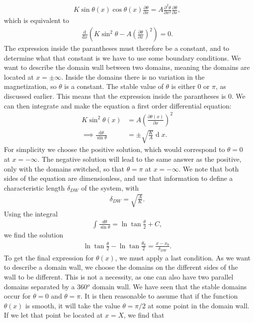 \documentclass[12pt, a4paper, twoside, openright]{article}		%
\renewcommand{\d}[1]{\ensuremath{\operatorname{d}\!{#1}}}
\numberwithin{equation}{section}
\begin{document}
\begin{align}
\label{eq:theta_doublediff}
K\sin \theta (x) \cos \theta (x) \frac{\partial \theta}{\partial x} = A \frac{\partial^2 \theta}{\partial x^2}\frac{\partial \theta}{\partial x},
\end{align}
which is equivalent to
\begin{align}
\frac{\textrm{d}}{\textrm{d} x} \left(K \sin ^2 \theta - A (\frac{\partial \theta}{\partial x})^2\right) = 0.
\end{align}
The expression inside the parantheses must therefore be a constant, and to determine what that constant is we have to use some boundary conditions. We want to describe the domain wall between two domains, meaning the domains are located at $x = \pm \infty$. Inside the domains there is no variation in the magnetization, so $\theta$ is a constant. The stable value of $\theta$ is either 0 or $\pi$, as discussed earlier. This means that the expression inside the parantheses is 0. We can then integrate and make the equation a first order differential equation:
\begin{align*}
K \sin ^2 \theta(x) &= A \left(\frac{\partial \theta(x)}{\partial x}\right)^2 \\
\implies \frac{\textrm{d} \theta}{\sin \theta} &= \pm \sqrt{\frac{K}{A}} \d x.
\end{align*}
For simplicity we choose the positive solution, which would correspond to $\theta = 0$ at $x = -\infty$. The negative solution will lead to the same answer as the positive, only with the domains switched, so that $\theta = \pi$ at $x = -\infty$. We note that both sides of the equation are dimensionless, and use that information to define a characteristic length $\delta_{DW}$ of the system, with
\begin{align}
\delta_{DW} = \sqrt{\frac{A}{K}}.
\end{align}
Using the integral
\begin{align}
\int \frac{d\theta}{\sin\theta} = \ln \tan\frac{\theta}{2} + C,
\end{align}
we find the solution
\begin{align}
\ln \tan\frac{\theta}{2} - \ln \tan\frac{\theta_0}{2} = \frac{x-x_0}{\delta_{DW}}.
\end{align}
To get the final expression for $\theta(x)$, we must apply a last condition. As we want to describe a domain wall, we choose the domains on the different sides of the wall to be different. This is not a necessity, as one can also have two parallel domains separated by a 360$^o$ domain wall. We have seen that the stable domains occur for $\theta = 0$ and $\theta = \pi$. It is then reasonable to assume that if the function $\theta (x)$ is smooth, it will take the value $\theta = \pi/2$ at some point in the domain wall. If we let that point be located at $x = X$, we find that
\end{document}
